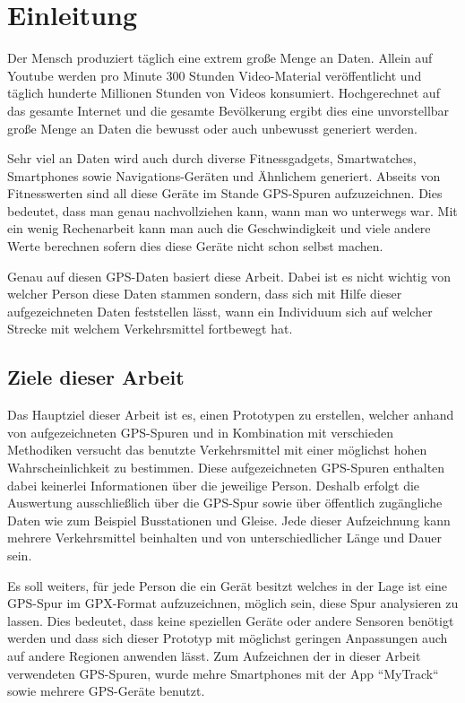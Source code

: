 \chapter{Einleitung}
Der Mensch produziert täglich eine extrem große Menge an Daten. Allein auf Youtube werden pro Minute 300 Stunden Video-Material veröffentlicht und täglich hunderte Millionen Stunden von Videos konsumiert.  \cite{youtube_statistics_2015} Hochgerechnet auf das gesamte Internet und die gesamte Bevölkerung ergibt dies eine unvorstellbar große Menge an Daten die bewusst oder auch unbewusst generiert werden. 

Sehr viel an Daten wird auch durch diverse Fitnessgadgets, Smartwatches, Smartphones sowie Navigations-Geräten und Ähnlichem generiert. Abseits von Fitnesswerten sind all diese Geräte im Stande GPS-Spuren aufzuzeichnen. Dies bedeutet, dass man genau nachvollziehen kann, wann man wo unterwegs war. Mit ein wenig Rechenarbeit kann man auch die Geschwindigkeit und viele andere Werte berechnen sofern dies diese Geräte nicht schon selbst machen. 

Genau auf diesen GPS-Daten basiert diese Arbeit. Dabei ist es nicht wichtig von welcher Person diese Daten stammen sondern, dass sich mit Hilfe dieser aufgezeichneten Daten feststellen lässt, wann ein Individuum sich auf welcher Strecke mit welchem Verkehrsmittel fortbewegt hat.

\section{Ziele dieser Arbeit}
Das Hauptziel dieser Arbeit ist es, einen Prototypen zu erstellen, welcher anhand von aufgezeichneten GPS-Spuren und in Kombination mit verschieden Methodiken versucht das benutzte Verkehrsmittel mit einer möglichst hohen Wahrscheinlichkeit zu bestimmen. Diese aufgezeichneten GPS-Spuren enthalten dabei keinerlei Informationen über die jeweilige Person. Deshalb erfolgt die Auswertung ausschließlich über die GPS-Spur sowie über öffentlich zugängliche Daten wie zum Beispiel Busstationen und Gleise. Jede dieser Aufzeichnung kann mehrere Verkehrsmittel beinhalten und von unterschiedlicher Länge und Dauer sein.

Es soll weiters, für jede Person die ein Gerät besitzt welches in der Lage ist eine GPS-Spur im GPX-Format aufzuzeichnen, möglich sein, diese Spur analysieren zu lassen. Dies bedeutet, dass keine speziellen Geräte oder andere Sensoren benötigt werden und dass sich dieser Prototyp mit möglichst geringen Anpassungen auch auf andere Regionen anwenden lässt. Zum Aufzeichnen der in dieser Arbeit verwendeten GPS-Spuren, wurde mehre Smartphones mit der App ``MyTrack`` sowie mehrere GPS-Geräte benutzt.

